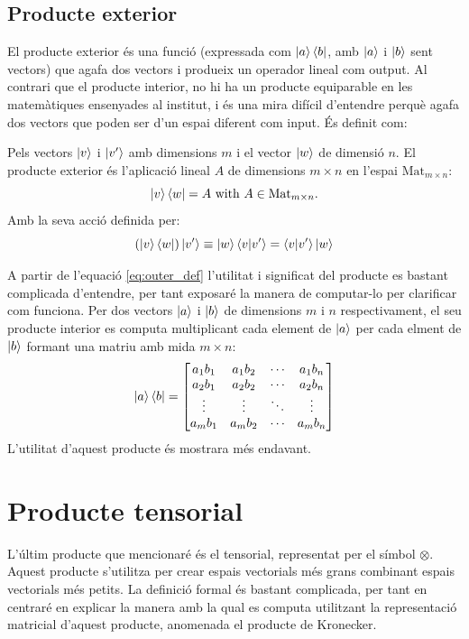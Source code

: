 \subsection{Producte exterior}
El producte exterior és una funció (expressada com $\ket{a}\bra{b}$, amb $\ket{a}$ i $\ket{b}$ sent vectors) que agafa dos vectors i produeix un operador lineal com output. Al contrari que el producte interior, no hi ha un producte equiparable en les matemàtiques ensenyades al institut, i és una mira difícil d'entendre perquè agafa dos vectors que poden ser d'un espai diferent com input.
És definit com: 

Pels vectors $\ket{v}$ i $\ket{v'}$ amb dimensions $m$ i el vector $\ket{w}$ de dimensió $n$. El producte exterior és l'aplicació lineal $A$ de dimensions $m \times n$ en l'espai $\mathrm{Mat}_{m\times n}$:
$$
\ket{v}\bra{w} = A \text{ with } A\in \mathrm{Mat}_{m\times n} .
$$ 
Amb la seva acció definida per: 
\begin{equation}
	(\ket{v}\bra{w})\ket{v'} \equiv \ket{w}\bra{v}\ket{v'} = \bra{v}\ket{v'}\ket{w}
	\label{eq:outer_def}
\end{equation}

A partir de l'equació \eqref{eq:outer_def} l'utilitat i significat del producte es bastant complicada d'entendre, per tant exposaré la manera de computar-lo per clarificar com funciona. Per dos vectors $\ket{a}$ i $\ket{b}$ de dimensions $m$ i $n$ respectivament, el seu producte interior es computa multiplicant cada element de $\ket{a}$ per cada elment de $\ket{b}$ formant una matriu amb mida $m\times n$:
$$
\ket{a}\bra{b} = \begin{bmatrix}
	a_1 b_1 & a_1 b_2 & \cdots & a_1 b_n \\
	a_2 b_1 & a_2 b_2 & \cdots & a_2 b_n \\
	\vdots  & \vdots  & \ddots& \vdots  \\
	a_m b_1 & a_m b_2 & \cdots & a_m b_n \\
\end{bmatrix}
$$
L'utilitat d'aquest producte és mostrara més endavant.

\section{Producte tensorial}
L'últim producte que mencionaré és el tensorial, representat per el símbol $\otimes$. Aquest producte s'utilitza per crear espais vectorials més grans combinant espais vectorials més petits. La definició formal és bastant complicada, per tant en centraré en explicar la manera amb la qual es computa utilitzant la representació matricial d'aquest producte, anomenada el producte de Kronecker. 

